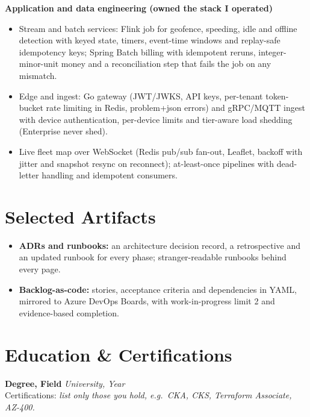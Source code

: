 \documentclass[10pt,letterpaper]{article}
\newcommand{\theme}[1]{\vspace{3pt}\textbf{\color{accent}#1}\par\vspace{-1pt}}
\begin{document}
\theme{Application and data engineering (owned the stack I operated)}
\begin{itemize}
  \item Stream and batch services: Flink job for geofence, speeding, idle and offline detection with keyed state, timers, event-time windows and replay-safe idempotency keys; Spring Batch billing with idempotent reruns, integer-minor-unit money and a reconciliation step that fails the job on any mismatch. %
  \item Edge and ingest: Go gateway (JWT/JWKS, API keys, per-tenant token-bucket rate limiting in Redis, problem+json errors) and gRPC/MQTT ingest with device authentication, per-device limits and tier-aware load shedding (Enterprise never shed). %
  \item Live fleet map over WebSocket (Redis pub/sub fan-out, Leaflet, backoff with jitter and snapshot resync on reconnect); at-least-once pipelines with dead-letter handling and idempotent consumers. %
\end{itemize}

\section{Selected Artifacts}
\begin{itemize}
  \item \textbf{ADRs and runbooks:} an architecture decision record, a retrospective and an updated runbook for every phase; stranger-readable runbooks behind every page. %
  \item \textbf{Backlog-as-code:} stories, acceptance criteria and dependencies in YAML, mirrored to Azure DevOps Boards, with work-in-progress limit 2 and evidence-based completion. %
\end{itemize}

\section{Education \& Certifications}
\textbf{Degree, Field} \hfill \textit{University, Year}\\
Certifications: \textit{list only those you hold, e.g.\ CKA, CKS, Terraform Associate, AZ-400.}
\end{document}
